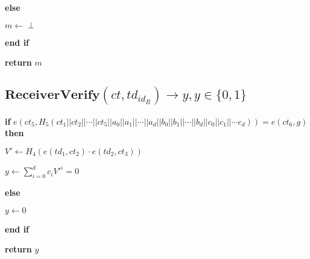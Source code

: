 \documentclass[a4paper]{article}
\begin{document}
\textbf{else}

\quad$m \gets \perp$

\textbf{end if}

\textbf{return} $m$

\subsection{$\textbf{ReceiverVerify}(\textit{ct}, \textit{td}_{\textit{id}_R}) \rightarrow y, y \in \{0, 1\}$}

\textbf{if} $e(\textit{ct}_5, H_5(\textit{ct}_1 || \textit{ct}_2 || \cdots || \textit{ct}_5 || a_0 || a_1 || \cdots || a_d || b_0 || b_1 || \cdots || b_d || c_0 || c_1 || \cdots c_d)) = e(\textit{ct}_6, g)$ \textbf{then}

\quad$V' \gets H_4(e(\textit{td}_1, \textit{ct}_2) \cdot e(\textit{td}_2, \textit{ct}_3))$

\quad$y \gets \sum\limits_{i = 0}^d c_i V'^i = 0$

\textbf{else}

\quad$y \gets 0$

\textbf{end if}

\textbf{return} $y$
\end{document}
